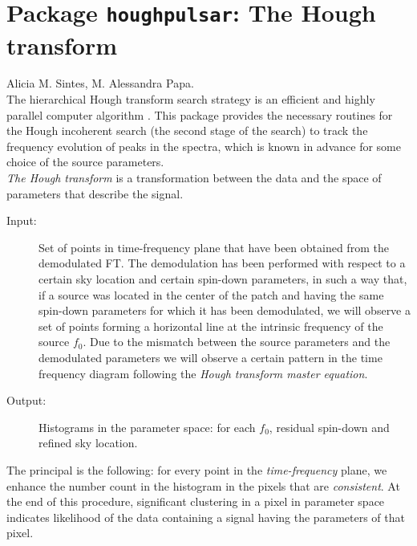 %  
%
%
%

\chapter{Package \texttt{houghpulsar}: The Hough transform}


Alicia M. Sintes, M. Alessandra Papa.\\

The  hierarchical Hough transform search strategy is 
an efficient and highly parallel computer algorithm 
\cite{Schutz:1998} \cite{Papa:2001}.
This package provides the necessary routines for the Hough incoherent search
(the second stage of the search) 
  to track the frequency evolution of peaks in the spectra, which
  is known in advance for some choice of the source parameters.\\


{\it The Hough transform} is  a transformation
between the data and the space of parameters that describe the signal.
\begin{description}
\item[ Input:] Set of points in time-frequency plane that have been obtained
from the demodulated FT.
The demodulation  has been performed with respect to a certain sky
location and certain spin-down parameters,
in such a way  that, if a source was located in
the center of the patch and having the same spin-down parameters 
for which it has been
demodulated, we will observe a set of points forming a horizontal 
line at the intrinsic frequency  of the source $f_0$.
 Due to the mismatch between the source  parameters
 and the demodulated parameters we will observe a certain pattern in the time
  frequency diagram following the 
   {\sl Hough transform master equation}.
\item[ Output:] Histograms in the parameter space:
  for each $f_0$, residual spin-down and refined sky location.
\end{description}
The principal is the following: for every point in the {\it  time-frequency}
 plane, we enhance the number count in the 
histogram in the pixels that are {\it consistent}. At the end of this procedure,
significant clustering
 in a pixel in parameter space indicates
 likelihood of the data containing a signal 
having the parameters
of that pixel.
\\

